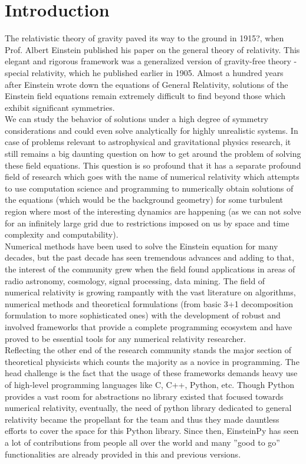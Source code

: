 \documentclass{aastex63}
\begin{document}
\section{Introduction} \label{sec:intro}
The relativistic theory of gravity paved its way to the ground in 1915?, when Prof. Albert Einstein published his paper on the general theory of relativity. This elegant and rigorous framework was a generalized version of gravity-free theory - special relativity, which he published earlier in 1905. Almost a hundred years after Einstein wrote down the equations of General Relativity, solutions of the Einstein field equations remain extremely difficult to find beyond those which exhibit significant symmetries.\\
We can study the behavior of solutions under a high degree of symmetry considerations and could even solve analytically for highly unrealistic systems. In case of problems relevant to astrophysical and gravitational physics research, it still remains a big daunting question on how to get around the problem of solving these field equations. This question is so profound that it has a separate profound field of research which goes with the name of numerical relativity which attempts to use computation science and programming to numerically obtain solutions of the equations (which would be the background geometry) for some turbulent region where most of the interesting dynamics are happening (as we can not solve for an infinitely large grid due to restrictions imposed on us by space and time complexity and computability).\\
Numerical methods have been used to solve the Einstein equation for many decades, but the past decade has seen tremendous advances and adding to that, the interest of the community grew when the field found applications in areas of radio astronomy, cosmology, signal processing, data mining. The field of numerical relativity is growing rampantly with the vast literature on algorithms, numerical methods and theoretical formulations (from basic 3+1 decomposition formulation to more sophisticated ones) with the development of robust and involved frameworks that provide a complete programming ecosystem and have proved to be essential tools for any numerical relativity researcher.\\
Reflecting the other end of the research community stands the major section of theoretical physicists which counts the majority as a novice in programming. The head challenge is the fact that the usage of these frameworks demands heavy use of high-level programming languages like C, C++, Python, etc. Though Python provides a vast room for abstractions no library existed that focused towards numerical relativity, eventually, the need of python library dedicated to general relativity became the propellant for the team and thus they made dauntless efforts to cover the space for this Python library. Since then, EinsteinPy has seen a lot of contributions from people all over the world and many ”good to go” functionalities are already provided in this and previous versions.\\
\end{document}
